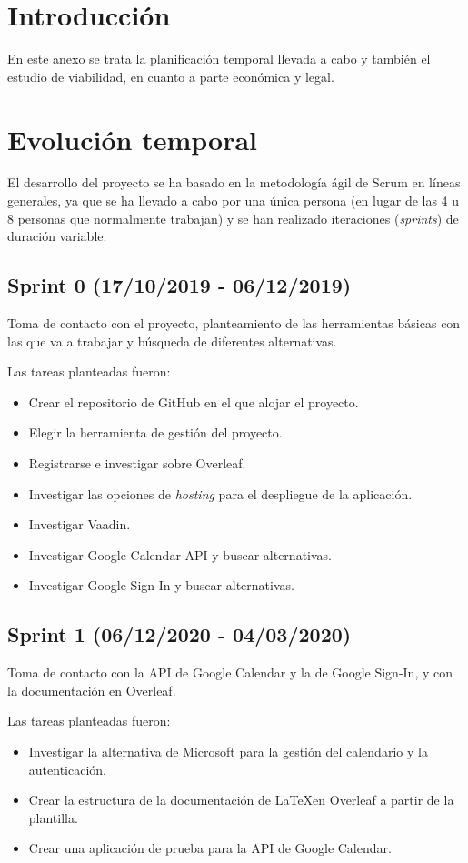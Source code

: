 
\section{Introducción}
En este anexo se trata la planificación temporal llevada a cabo y también el estudio de viabilidad, en cuanto a parte económica y legal.

\section{Evolución temporal}
El desarrollo del proyecto se ha basado en la metodología ágil de Scrum en líneas generales, ya que se ha llevado a cabo por una única persona (en lugar de las 4 u 8 personas que normalmente trabajan) y se han realizado iteraciones (\textit{sprints}) de duración variable.

\subsection{Sprint 0 (17/10/2019 - 06/12/2019)}
Toma de contacto con el proyecto, planteamiento de las herramientas básicas con las que va a trabajar y búsqueda de diferentes alternativas.

Las tareas planteadas fueron:
\begin{itemize}
\tightlist
    \item Crear el repositorio de GitHub en el que alojar el proyecto.
    \item Elegir la herramienta de gestión del proyecto.
    \item Registrarse e investigar sobre Overleaf.
    \item Investigar las opciones de \textit{hosting} para el despliegue de la aplicación.
    \item Investigar Vaadin.
    \item Investigar Google Calendar API y buscar alternativas.
    \item Investigar Google Sign-In y buscar alternativas.
\end{itemize}

\subsection{Sprint 1 (06/12/2020 - 04/03/2020)}
Toma de contacto con la API de Google Calendar y la de Google Sign-In, y con la documentación en Overleaf.

Las tareas planteadas fueron:
\begin{itemize}
\tightlist
    \item Investigar la alternativa de Microsoft para la gestión del calendario y la autenticación.
    \item Crear la estructura de la documentación de \LaTeX en Overleaf a partir de la plantilla.
    \item Crear una aplicación de prueba para la API de Google Calendar.
\end{itemize}


